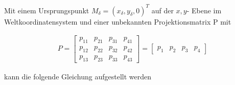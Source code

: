 
Mit einem Ursprungspunkt $M_\delta=(x_\delta,y_\delta,0)^T$ auf der $x,y$- Ebene im Weltkoordinatensystem und einer unbekannten Projektionsmatrix P mit

\begin{gather}
	P=
	\begin{bmatrix}
		p_{11}&p_{21}&p_{31}&p_{41}\\
		p_{12}&p_{22}&p_{32}&p_{42}\\
		p_{13}&p_{23}&p_{33}&p_{43}
	\end{bmatrix}=	\begin{bmatrix}
		p_1&p_2&p_3&p_4
	\end{bmatrix}
\end{gather} 

kann die folgende Gleichung aufgestellt werden \cite{Elements}


